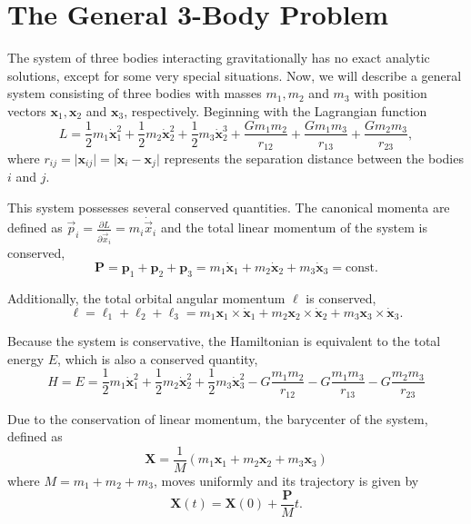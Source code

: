  \section{The General 3-Body Problem}
The system of three bodies interacting gravitationally has no exact analytic solutions, except for some very special situations. Now, we will describe a general system consisting of three bodies with masses $m_1, m_2$ and $m_3$ with position vectors $\textbf{x}_1, \textbf{x}_2$ and $\textbf{x}_3$, respectively. Beginning with the Lagrangian function 
\begin{equation}
L=\frac{1}{2}m_{1}\dot{\textbf{x}}_{1}^{2} + \frac{1}{2}m_{2}\dot{\textbf{x}}_2^{2} + \frac{1}{2}m_{3}\dot{\textbf{x}}_2^{3} + \frac{Gm_1m_2}{r_{12}} + \frac{Gm_1m_3}{r_{13}} + \frac{Gm_2m_3}{r_{23}},\label{eq:3BodyLagrangian}
\end{equation}
where $r_{ij}=\vert{}\textbf{x}_{ij}\vert{}=\vert{}\textbf{x}_i-\textbf{x}_j\vert{}$ represents the separation distance between the bodies $i$ and $j$.

This system possesses several conserved quantities. The canonical momenta are defined as $\vec{p}_i = \frac{\partial L}{\partial \dot{\vec{x}}_i} = m_i \dot{\vec{x}}_i$ and the total linear momentum of the system is conserved,
\begin{equation}    \textbf{P}=\textbf{p}_{1}+\textbf{p}_{2}+\textbf{p}_{3}=m_{1}\dot{\textbf{x}}_{1}+m_{2}\dot{\textbf{x}}_{2}+m_{3}\dot{\textbf{x}}_{3}=\text{const.}
\end{equation}

Additionally, the total orbital angular momentum $\boldsymbol{\ell}$ is conserved,
\begin{equation}
\boldsymbol{\ell}=\boldsymbol{\ell}_{1}+\boldsymbol{\ell}_{2}+\boldsymbol{\ell}_{3}=m_{1}\textbf{x}_{1}\times\dot{\textbf{x}}_{1}+m_{2}\textbf{x}_{2}\times\dot{\textbf{x}}_{2}+m_{3}\textbf{x}_{3}\times\dot{\textbf{x}}_{3}.
\end{equation}

Because the system is conservative, the Hamiltonian is equivalent to the total energy $E$, which is also a conserved quantity,
\begin{equation}
    H=E=\frac{1}{2}m_{1}\dot{\textbf{x}}_{1}^{2}+\frac{1}{2}m_{2}\dot{\textbf{x}}_{2}^{2}+\frac{1}{2}m_{3}\dot{\textbf{x}}_{3}^{2}-G\frac{m_{1}m_{2}}{r_{12}}-G\frac{m_{1}m_{3}}{r_{13}}-G\frac{m_{2}m_{3}}{r_{23}}
\end{equation}

Due to the conservation of linear momentum, the barycenter of the system, defined as 
\begin{equation}
    \textbf{X} = \frac{1}{M}(m_1\textbf{x}_1 + m_2\textbf{x}_2 + m_3\textbf{x}_3)
\end{equation}
 where $M = m_1 + m_2 + m_3$, moves uniformly and its trajectory is given by
 \begin{equation}
     \textbf{X}(t) = \textbf{X}(0) + \frac{\textbf{P}}{M}t.
 \end{equation}

